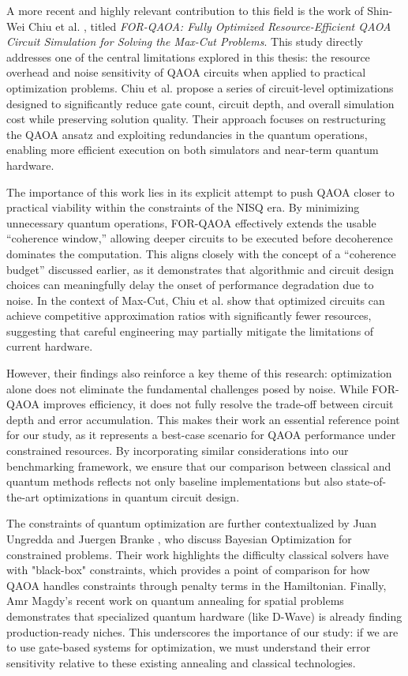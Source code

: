 \documentclass[12pt]{article}
\begin{document}
A more recent and highly relevant contribution to this field is the work of Shin-Wei Chiu et al. \cite{chiu}, titled \textit{FOR-QAOA: Fully Optimized Resource-Efficient QAOA Circuit Simulation for Solving the Max-Cut Problems}. This study directly addresses one of the central limitations explored in this thesis: the resource overhead and noise sensitivity of QAOA circuits when applied to practical optimization problems. Chiu et al. propose a series of circuit-level optimizations designed to significantly reduce gate count, circuit depth, and overall simulation cost while preserving solution quality. Their approach focuses on restructuring the QAOA ansatz and exploiting redundancies in the quantum operations, enabling more efficient execution on both simulators and near-term quantum hardware.

The importance of this work lies in its explicit attempt to push QAOA closer to practical viability within the constraints of the NISQ era. By minimizing unnecessary quantum operations, FOR-QAOA effectively extends the usable “coherence window,” allowing deeper circuits to be executed before decoherence dominates the computation. This aligns closely with the concept of a “coherence budget” discussed earlier, as it demonstrates that algorithmic and circuit design choices can meaningfully delay the onset of performance degradation due to noise. In the context of Max-Cut, Chiu et al. show that optimized circuits can achieve competitive approximation ratios with significantly fewer resources, suggesting that careful engineering may partially mitigate the limitations of current hardware.

However, their findings also reinforce a key theme of this research: optimization alone does not eliminate the fundamental challenges posed by noise. While FOR-QAOA improves efficiency, it does not fully resolve the trade-off between circuit depth and error accumulation. This makes their work an essential reference point for our study, as it represents a best-case scenario for QAOA performance under constrained resources. By incorporating similar considerations into our benchmarking framework, we ensure that our comparison between classical and quantum methods reflects not only baseline implementations but also state-of-the-art optimizations in quantum circuit design.

The constraints of quantum optimization are further contextualized by Juan Ungredda and Juergen Branke \cite{Juan}, who discuss Bayesian Optimization for constrained problems. Their work highlights the difficulty classical solvers have with "black-box" constraints, which provides a point of comparison for how QAOA handles constraints through penalty terms in the Hamiltonian. Finally, Amr Magdy’s \cite{magdy} recent work on quantum annealing for spatial problems demonstrates that specialized quantum hardware (like D-Wave) is already finding production-ready niches. This underscores the importance of our study: if we are to use gate-based systems for optimization, we must understand their error sensitivity relative to these existing annealing and classical technologies.
\end{document}
